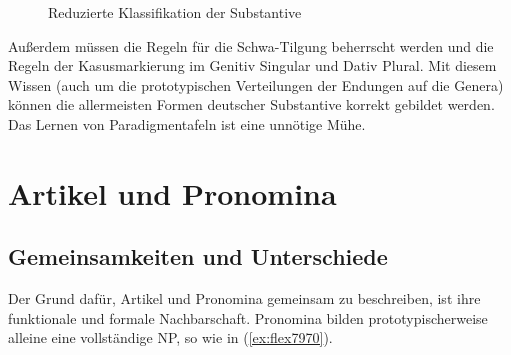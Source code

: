 \begin{figure}[!htbp]
  \centering
  \caption{Reduzierte Klassifikation der Substantive}
  \label{fig:neuenklassen}
\end{figure}

Außerdem müssen die Regeln für die Schwa-Tilgung beherrscht werden und die Regeln der Kasusmarkierung im Genitiv Singular und Dativ Plural.
Mit diesem Wissen (auch um die prototypischen Verteilungen der Endungen auf die Genera) können die allermeisten Formen deutscher Substantive korrekt gebildet werden.
Das Lernen von Paradigmentafeln ist eine unnötige Mühe.




\section{Artikel und Pronomina}

\label{sec:artikelpronomen}

\subsection{Gemeinsamkeiten und Unterschiede}

Der Grund dafür, Artikel und Pronomina gemeinsam zu beschreiben, ist ihre funktionale und formale Nachbarschaft.
Pronomina bilden prototypischerweise alleine eine vollständige NP, so wie in (\ref{ex:flex7970}).

\begin{exe}
  \ex \label{ex:flex7970}
  \begin{xlist}
  \end{xlist}
\end{exe}

